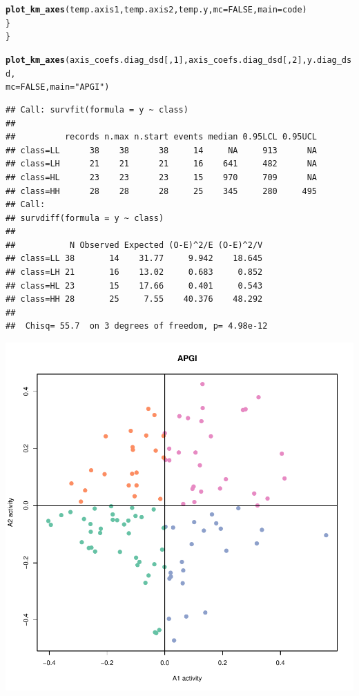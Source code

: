 \documentclass{article}\usepackage[]{graphicx}\usepackage[]{color}
\makeatletter
\def\maxwidth{ %
  \ifdim\Gin@nat@width>\linewidth
    \linewidth
  \else
    \Gin@nat@width
  \fi
}
\newcommand{\hlnum}[1]{\textcolor[rgb]{0.686,0.059,0.569}{#1}}%
\newcommand{\hlstr}[1]{\textcolor[rgb]{0.192,0.494,0.8}{#1}}%
\newcommand{\hlstd}[1]{\textcolor[rgb]{0.345,0.345,0.345}{#1}}%
\newcommand{\hlkwc}[1]{\textcolor[rgb]{0.333,0.667,0.333}{#1}}%
\newcommand{\hlkwd}[1]{\textcolor[rgb]{0.737,0.353,0.396}{\textbf{#1}}}%
\newenvironment{kframe}{%
 \def\at@end@of@kframe{}%
 \ifinner\ifhmode%
  \def\at@end@of@kframe{\end{minipage}}%
  \begin{minipage}{\columnwidth}%
 \fi\fi%
 \def\FrameCommand##1{\hskip\@totalleftmargin \hskip-\fboxsep
 \colorbox{shadecolor}{##1}\hskip-\fboxsep
     \hskip-\linewidth \hskip-\@totalleftmargin \hskip\columnwidth}%
 \MakeFramed {\advance\hsize-\width
   \@totalleftmargin\z@ \linewidth\hsize
   \@setminipage}}%
 {\par\unskip\endMakeFramed%
 \at@end@of@kframe}
\newenvironment{knitrout}{}{} %
\makeatother
\begin{document}
\begin{knitrout}
\begin{kframe}
\begin{alltt}
        \hlkwd{plot_km_axes}\hlstd{(temp.axis1, temp.axis2, temp.y,} \hlkwc{mc} \hlstd{=} \hlnum{FALSE}\hlstd{,} \hlkwc{main} \hlstd{= code)}
    \hlstd{\}}
\hlstd{\}}

\hlkwd{plot_km_axes}\hlstd{(axis_coefs.diag_dsd[,} \hlnum{1}\hlstd{], axis_coefs.diag_dsd[,} \hlnum{2}\hlstd{], y.diag_dsd,}
    \hlkwc{mc} \hlstd{=} \hlnum{FALSE}\hlstd{,} \hlkwc{main} \hlstd{=} \hlstr{"APGI"}\hlstd{)}
\end{alltt}
\begin{verbatim}
## Call: survfit(formula = y ~ class)
## 
##          records n.max n.start events median 0.95LCL 0.95UCL
## class=LL      38    38      38     14     NA     913      NA
## class=LH      21    21      21     16    641     482      NA
## class=HL      23    23      23     15    970     709      NA
## class=HH      28    28      28     25    345     280     495
## Call:
## survdiff(formula = y ~ class)
## 
##           N Observed Expected (O-E)^2/E (O-E)^2/V
## class=LL 38       14    31.77     9.942    18.645
## class=LH 21       16    13.02     0.683     0.852
## class=HL 23       15    17.66     0.401     0.543
## class=HH 28       25     7.55    40.376    48.292
## 
##  Chisq= 55.7  on 3 degrees of freedom, p= 4.98e-12
\end{verbatim}
\end{kframe}

{\centering \includegraphics[width=\maxwidth]{figure/km-curves-1} 

}
\end{knitrout}
\end{document}
